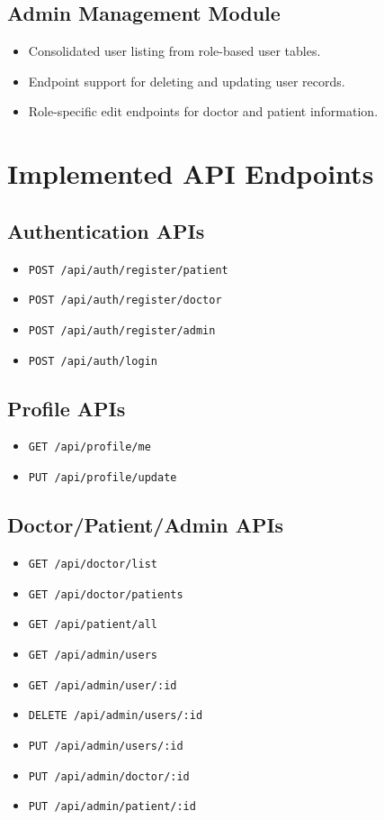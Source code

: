 \documentclass[12pt,a4paper]{article}
\begin{document}
\subsection{Admin Management Module}
\begin{itemize}[leftmargin=1.2cm]
    \item Consolidated user listing from role-based user tables.
    \item Endpoint support for deleting and updating user records.
    \item Role-specific edit endpoints for doctor and patient information.
\end{itemize}

\section{Implemented API Endpoints}
\subsection{Authentication APIs}
\begin{itemize}[leftmargin=1.2cm]
    \item \texttt{POST /api/auth/register/patient}
    \item \texttt{POST /api/auth/register/doctor}
    \item \texttt{POST /api/auth/register/admin}
    \item \texttt{POST /api/auth/login}
\end{itemize}

\subsection{Profile APIs}
\begin{itemize}[leftmargin=1.2cm]
    \item \texttt{GET /api/profile/me}
    \item \texttt{PUT /api/profile/update}
\end{itemize}

\subsection{Doctor/Patient/Admin APIs}
\begin{itemize}[leftmargin=1.2cm]
    \item \texttt{GET /api/doctor/list}
    \item \texttt{GET /api/doctor/patients}
    \item \texttt{GET /api/patient/all}
    \item \texttt{GET /api/admin/users}
    \item \texttt{GET /api/admin/user/:id}
    \item \texttt{DELETE /api/admin/users/:id}
    \item \texttt{PUT /api/admin/users/:id}
    \item \texttt{PUT /api/admin/doctor/:id}
    \item \texttt{PUT /api/admin/patient/:id}
\end{itemize}
\end{document}
